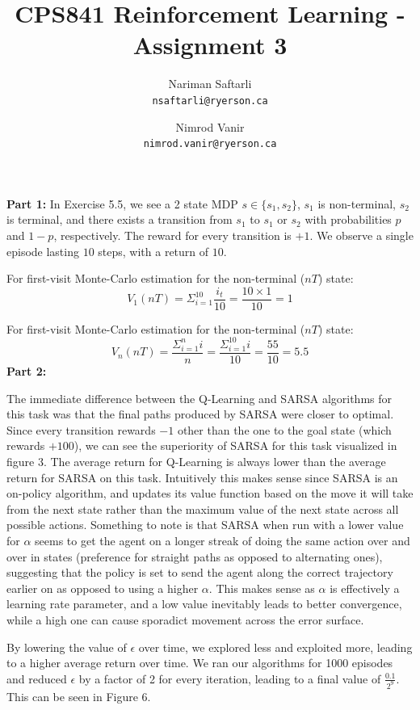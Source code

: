 \documentclass{article}
\title{CPS841 Reinforcement Learning - Assignment 3}
\author{
	Nariman Saftarli\\
	\texttt{nsaftarli@ryerson.ca}
	\and
	Nimrod Vanir\\
	\texttt{nimrod.vanir@ryerson.ca}
	}
\begin{document}
\maketitle
\newpage

\textbf{Part 1:} In Exercise 5.5, we see a 2 state MDP $s \in \{s_1, s_2\}$, $s_1$ is non-terminal, $s_2$ is terminal, and there exists a transition from $s_1$ to $s_1$ or $s_2$ with probabilities $p$ and $1-p$, respectively. The reward for every transition is $+1$. We observe a single episode lasting $10$ steps, with a return of $10$. 

For first-visit Monte-Carlo estimation for the non-terminal ($nT$) state: 
\begin{equation}
V_1(nT) = \Sigma_{i=1}^{10} \frac{i_t}{10} = \frac{10 \times 1}{10} = 1
\end{equation}

For first-visit Monte-Carlo estimation for the non-terminal ($nT$) state: 
\begin{equation}
V_n(nT) = \frac{\Sigma_{i=1}^{n} i}{n} = \frac{\Sigma_{i=1}^{10} i}{10} = \frac{55}{10} = 5.5
\end{equation}
\bigskip
\textbf{Part 2:}

The immediate difference between the Q-Learning and SARSA algorithms for this task was that the final paths produced by SARSA were closer to optimal. Since every transition rewards $-1$ other than the one to the goal state (which rewards $+100$), we can see the superiority of SARSA for this task visualized in figure 3. The average return for Q-Learning is always lower than the average return for SARSA on this task. Intuitively this makes sense since SARSA is an on-policy algorithm, and updates its value function based on the move it will take from the next state rather than the maximum value of the next state across all possible actions. Something to note is that SARSA when run with a lower value for $\alpha$ seems to get the agent on a longer streak of doing the same action over and over in states (preference for straight paths as opposed to alternating ones), suggesting that the policy is set to send the agent along the correct trajectory earlier on as opposed to using a higher $\alpha$. This makes sense as $\alpha$ is effectively a learning rate parameter, and a low value inevitably leads to better convergence, while a high one can cause sporadict movement across the error surface. 

By lowering the value of $\epsilon$ over time, we explored less and exploited more, leading to a higher average return over time. We ran our algorithms for 1000 episodes and reduced $\epsilon$ by a factor of 2 for every iteration, leading to a final value of $\frac{0.1}{2^9}$. This can be seen in Figure 6.
\end{document}
